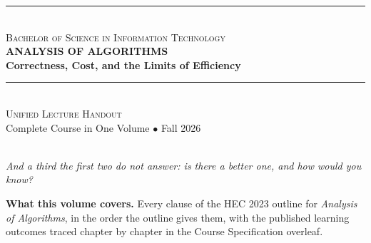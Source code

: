 \thispagestyle{empty}

\begin{center}
\vspace*{1.0cm}

{\color{secondary}\rule{0.85\textwidth}{2pt}}\\[6pt]
{\large\textsc{\color{secondary}Bachelor of Science in Information Technology}}\\[18pt]

{\Huge\bfseries\color{primary}ANALYSIS OF ALGORITHMS}\\[10pt]
{\LARGE\bfseries\color{primary}Correctness, Cost, and the Limits of Efficiency}\\[16pt]

{\color{secondary}\rule{0.85\textwidth}{2pt}}\\[16pt]

{\Large\textsc{Unified Lecture Handout}}\\[6pt]
{\large\color{gray!70!black}Complete Course in One Volume $\bullet$ Fall 2026}\\[24pt]

\\[10pt]
{\small\itshape\color{gray!70!black}And a third the first two do not answer:
is there a better one, and how would you know?}

\vspace{1.0cm}

\begin{tcolorbox}[enhanced, width=0.86\textwidth, colback=lightbg,
  colframe=primary, boxrule=0pt, leftrule=4pt, arc=2pt, top=6pt, bottom=6pt]
\small
\textbf{\color{primary}What this volume covers.} Every clause of the HEC 2023
outline for \emph{Analysis of Algorithms}, in the order the outline gives them,
with the published learning outcomes traced chapter by chapter in the Course
Specification overleaf.


\end{tcolorbox}
\end{center}

